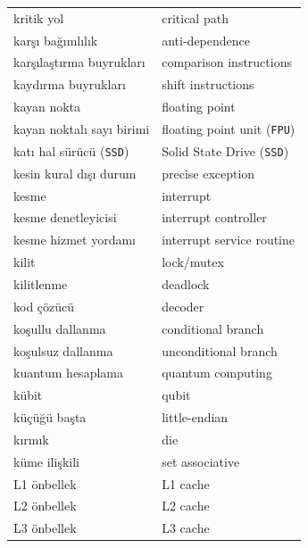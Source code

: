 {\begin{longtable}{@{}p{7.6cm}p{7.6cm}@{}}
kritik yol & critical path \\
karşı bağımlılık & anti-dependence \\
karşılaştırma buyrukları & comparison instructions \\
kaydırma buyrukları & shift instructions \\
kayan nokta & floating point \\
kayan noktalı sayı birimi & floating point unit (\texttt{FPU}) \\
katı hal sürücü (\texttt{SSD}) & Solid State Drive (\texttt{SSD}) \\
kesin kural dışı durum & precise exception \\
kesme & interrupt \\
kesme denetleyicisi & interrupt controller \\
kesme hizmet yordamı & interrupt service routine \\
kilit & lock/mutex \\
kilitlenme & deadlock \\
kod çözücü & decoder \\
koşullu dallanma & conditional branch \\
koşulsuz dallanma & unconditional branch \\
kuantum hesaplama & quantum computing \\
kübit & qubit \\
küçüğü başta & little-endian \\
kırmık & die \\
küme ilişkili & set associative \\

L1 önbellek & L1 cache \\
L2 önbellek & L2 cache \\
L3 önbellek & L3 cache \\


\end{longtable}}
